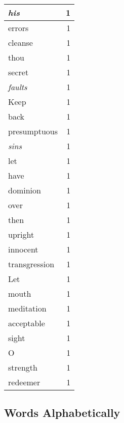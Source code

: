 \begin{center}
\begin{longtable}{l|r}
\emph{his} & 1 \\ \hline
errors & 1 \\ \hline
cleanse & 1 \\ \hline
thou & 1 \\ \hline
secret & 1 \\ \hline
\emph{faults} & 1 \\ \hline
Keep & 1 \\ \hline
back & 1 \\ \hline
presumptuous & 1 \\ \hline
\emph{sins} & 1 \\ \hline
let & 1 \\ \hline
have & 1 \\ \hline
dominion & 1 \\ \hline
over & 1 \\ \hline
then & 1 \\ \hline
upright & 1 \\ \hline
innocent & 1 \\ \hline
transgression & 1 \\ \hline
Let & 1 \\ \hline
mouth & 1 \\ \hline
meditation & 1 \\ \hline
acceptable & 1 \\ \hline
sight & 1 \\ \hline
O & 1 \\ \hline
strength & 1 \\ \hline
redeemer & 1 \\ \hline
\end{longtable}
\end{center}



\normalsize



\subsection{Words Alphabetically}

